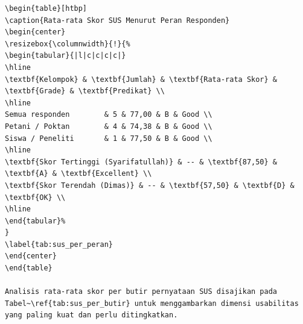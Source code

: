 \documentclass[conference]{IEEEtran}
\begin{document}
\begin{lstlisting}
\begin{table}[htbp]
\caption{Rata-rata Skor SUS Menurut Peran Responden}
\begin{center}
\resizebox{\columnwidth}{!}{%
\begin{tabular}{|l|c|c|c|c|}
\hline
\textbf{Kelompok} & \textbf{Jumlah} & \textbf{Rata-rata Skor} & \textbf{Grade} & \textbf{Predikat} \\
\hline
Semua responden        & 5 & 77,00 & B & Good \\
Petani / Poktan        & 4 & 74,38 & B & Good \\
Siswa / Peneliti       & 1 & 77,50 & B & Good \\
\hline
\textbf{Skor Tertinggi (Syarifatullah)} & -- & \textbf{87,50} & \textbf{A} & \textbf{Excellent} \\
\textbf{Skor Terendah (Dimas)} & -- & \textbf{57,50} & \textbf{D} & \textbf{OK} \\
\hline
\end{tabular}%
}
\label{tab:sus_per_peran}
\end{center}
\end{table}

Analisis rata-rata skor per butir pernyataan SUS disajikan pada Tabel~\ref{tab:sus_per_butir} untuk menggambarkan dimensi usabilitas yang paling kuat dan perlu ditingkatkan.


\end{lstlisting}
\end{document}
